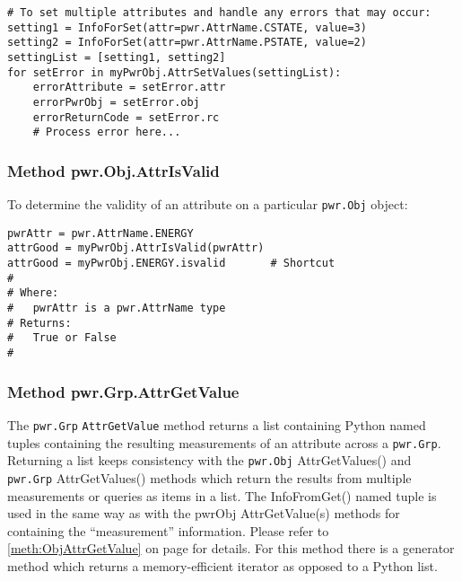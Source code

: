 \documentclass[12pt]{report} %
\begin{document}
\begin{appendices}
\begin{center}\begin{minipage}{.95\linewidth}\begin{lstlisting}
# To set multiple attributes and handle any errors that may occur:
setting1 = InfoForSet(attr=pwr.AttrName.CSTATE, value=3)
setting2 = InfoForSet(attr=pwr.AttrName.PSTATE, value=2)
settingList = [setting1, setting2]
for setError in myPwrObj.AttrSetValues(settingList):
    errorAttribute = setError.attr
    errorPwrObj = setError.obj
    errorReturnCode = setError.rc
    # Process error here...
\end{lstlisting}\end{minipage}\end{center}

\subsubsection{Method pwr.Obj.AttrIsValid} \label{meth:ObjAttrIsValid}

To determine the validity of an attribute on a particular \texttt{pwr.Obj}
object:

\begin{center}\begin{minipage}{.95\linewidth}\begin{lstlisting}
pwrAttr = pwr.AttrName.ENERGY
attrGood = myPwrObj.AttrIsValid(pwrAttr)
attrGood = myPwrObj.ENERGY.isvalid       # Shortcut
#
# Where:
#   pwrAttr is a pwr.AttrName type
# Returns:
#   True or False
#
\end{lstlisting}\end{minipage}\end{center}

\subsubsection{Method pwr.Grp.AttrGetValue}
\label{meth:GrpAttrGetValue}

The \texttt{pwr.Grp} \texttt{AttrGetValue} method returns a list containing Python
named tuples containing the resulting measurements of an attribute across a
\texttt{pwr.Grp}. Returning a list keeps consistency with the
\texttt{pwr.Obj} AttrGetValues() and \texttt{pwr.Grp} AttrGetValues()
methods which return the results from multiple measurements or queries as items
in a list. The InfoFromGet() named tuple is used in the same way
as with the pwrObj AttrGetValue(s) methods for containing
the ``measurement'' information. Please refer to \ref{meth:ObjAttrGetValue} on
page \pageref{meth:ObjAttrGetValue} for details. For this method there is a
generator method which returns a memory-efficient iterator as opposed to a
Python list.


\end{appendices}
\end{document}
